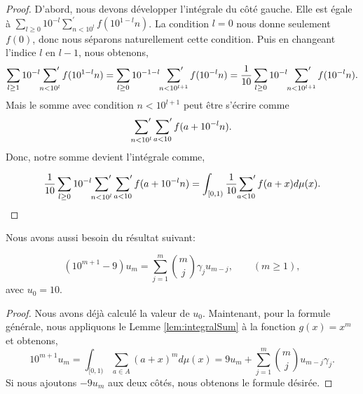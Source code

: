 \begin{proof}
	D'abord, nous devons développer l'intégrale du côté gauche. Elle est égale
	à $\sum_{l \ge 0} 10^{-l} \sum_{n<10^{l}}^{'} f(10^{1-l}n)$. La
	condition $l=0$ nous donne seulement $f(0)$, donc nous séparons
	naturellement cette condition. Puis en changeant l’indice $l$ en $l-1$,
	nous obtenons,
	\[
		\sum_{l\ge1} 10^{-l} \sideset{}{'}\sum_{n<10^{l}} f(10^{1-l}n) =
		\sum_{l\ge0} 10^{-1-l} \sideset{}{'}\sum_{n<10^{l+1}} f(10^{-l}n) = 
		\frac{1}{10} \sum_{l\ge0} 10^{-l} \sideset{}{'}\sum_{n<10^{l+1}} f(10^{-l}n).
	\]
	Mais le somme avec condition $n<10^{l+1}$ peut \^etre s'\'ecrire comme
	\[
		\sideset{}{'}\sum_{n<10^{l}} \sideset{}{'}\sum_{a<10} f(a+10^{-l}n).
	\]
	Donc, notre somme devient l'int\'egrale comme,

	\[
		\frac{1}{10} \sum_{l\ge0} 10^{-l} \sideset{}{'}\sum_{n<10^{l}} \sideset{}{'}\sum_{a<10} f(a+10^{-l}n) =
		\int_{[0, 1)} \frac{1}{10}\sideset{}{'}\sum_{a<10}f(a+x)d\mu(x).
	\]
\end{proof}
\noindent Nous avons aussi besoin du r\'esultat suivant:
\begin{prop}
	\[
		(10^{m+1}-9)u_{m} = \sum_{j=1}^{m}\binom{m}{j}\gamma_{j}u_{m-j}, \qquad
		(m \ge 1),
	\]
	avec $u_{0} = 10$.
	\label{prop:umrecursion}
\end{prop}
\begin{proof}
	Nous avons d\'ej\`a calcul\'e la valeur de $u_{0}$. Maintenant, pour la
	formule générale, nous appliquons le Lemme \ref{lem:integralSum} à la
	fonction $g(x) = x^{m}$ et obtenons,
	\[
		10^{m+1}u_{m} = \int_{[0, 1)} \sum_{a\in A}(a+x)^{m}d\mu(x) =
		9u_{m} + \sum_{j=1}^{m} \binom{m}{j}u_{m-j}\gamma_{j}.
	\]
	Si nous ajoutons $-9u_{m}$ aux deux c\^ot\'es, nous obtenons le formule
	d\'esir\'ee.
\end{proof}
